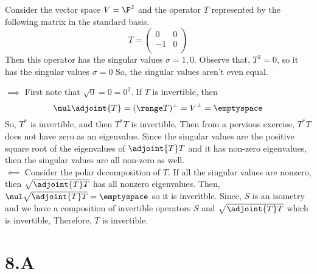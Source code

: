 \documentclass[10pt, twocolumn]{article}
\begin{document}
\begin{q}[12]
    Consider the vector space $ V = \F^2 $ and the operator $ T $ represented by the following matrix in the standard basis.
    $$
    T = 
        \left(
            \begin{array}{cc}
                0 & 0 \\
                -1 & 0 \\ 
            \end{array}
        \right)
    $$
    Then this operator has the singular values $ \sigma = 1, 0 $.
    Observe that, $ T^2 = 0 $, so it has the singular values $ \sigma = 0 $ 
    So, the singular values aren't even equal. 
\end{q}

\begin{q}[13]
    $ \implies $
    First note that $ \sqrt{0} = 0 = 0^2 $.
    If $ T $ is invertible, then $$ \nul \adjoint{T} = (\range T)^\perp = V^\perp = \emptyspace $$
    So, $ T^* $ is invertible, and then $ T^*T $ is invertible.  
    Then from a pervious exercise, $ T^* T $ does not have zero as an eigenvalue.
    Since the singular values are the positive square root of the eigenvalues of $ \adjoint{T} T $ and it has non-zero eigenvalues, 
    then the singular values are all non-zero as well. \\
    $ \impliedby $ Consider the polar decomposition of $ T $. 
    If all the singular values are nonzero, then $ \sqrt{\adjoint{T} T} $ has all nonzero eigenvalues.
    Then, $ \nul \sqrt{\adjoint{T} T} = \emptyspace $ so it is inveritble. 
    Since, $ S $ is an isometry and we have a composition of invertible operators $ S $ and $ \sqrt{\adjoint{T} T} $ which is invertible, 
    Therefore, $ T $ is invertible.
\end{q}

\pagebreak
\section{8.A}
\end{document}
